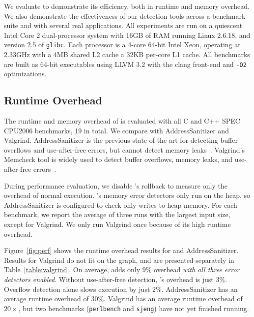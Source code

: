 \label{sec:evaluation}

We evaluate \doubletake{} to demonstrate its efficiency, both in runtime and memory overhead. We also demonstrate the effectiveness of our detection tools across a benchmark suite and with several real applications. All experiments are run on a quiescent Intel Core 2 dual-processor system with 16GB of RAM running Linux 2.6.18, and version 2.5 of \texttt{glibc}. Each processor is a 4-core 64-bit Intel Xeon, operating at 2.33GHz with a 4MB shared L2 cache a 32KB per-core L1 cache. All benchmarks are built as 64-bit executables using LLVM 3.2 with the clang front-end and \texttt{-O2} optimizations.


\subsection{Runtime Overhead}
\label{sec:evaluation/runtime}





The runtime and memory overhead of \doubletake{} is evaluated with all C and C++ SPEC CPU2006 benchmarks, 19 in total. We compare \doubletake{} with AddressSanitizer and Valgrind. AddressSanitizer is the previous state-of-the-art for detecting buffer overflows and use-after-free errors, but cannot detect memory leaks~\cite{AddressSanitizer}. Valgrind's Memcheck tool is widely used to detect buffer overflows, memory leaks, and use-after-free errors~\cite{overflow:valgrind}. 



During performance evaluation, we disable \doubletake{}'s rollback to measure only the overhead of normal execution. \doubletake{}'s memory error detectors only run on the heap, so AddressSanitizer is configured to check only writes to heap memory. For each benchmark, we report the average of three runs with the largest input size, except for Valgrind. We only run Valgrind once because of its high runtime overhead. 

Figure~\ref{fig:perf} shows the runtime overhead results for \doubletake{} and AddressSanitizer. Results for Valgrind do not fit on the graph, and are presented separately in Table~\ref{table:valgrind}. On average, \doubletake{} adds only $9\%$ overhead \emph{with all three error detectors enabled}. Without use-after-free detection, \doubletake{}'s overhead is just $3\%$. Overflow detection alone slows execution by just $2\%$. AddressSanitizer has an average runtime overhead of $30\%$. Valgrind has an average runtime overhead of $20\times$, but two benchmarks (\texttt{perlbench} and \texttt{sjeng}) have not yet finished running.

